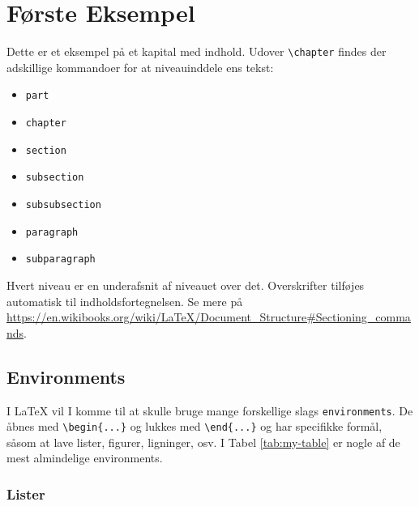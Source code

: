 
\chapter{Første Eksempel}
\label{ch:first-example}

Dette er et eksempel på et kapital med indhold.
Udover \verb!\chapter! findes der adskillige kommandoer for at niveauinddele ens tekst:
%
\begin{itemize}
\item \texttt{part}
\item \texttt{chapter}
\item \texttt{section}
\item \texttt{subsection}
\item \texttt{subsubsection}
\item \texttt{paragraph}
\item \texttt{subparagraph}
\end{itemize}
%
Hvert niveau er en underafsnit af niveauet over det.
Overskrifter tilføjes automatisk til indholdsfortegnelsen.
Se mere på \url{https://en.wikibooks.org/wiki/LaTeX/Document_Structure#Sectioning_commands}.


\section{Environments}
\label{sec:sec-within-chap}

I \LaTeX{} vil I komme til at skulle bruge mange forskellige slags \texttt{environments}.
De åbnes med \verb!\begin{...}! og lukkes med \verb!\end{...}! og har specifikke formål, såsom at lave lister, figurer, ligninger, osv.
I Tabel \ref{tab:my-table} er nogle af de mest almindelige environments.




\subsection{Lister}
\label{sec:lists}

